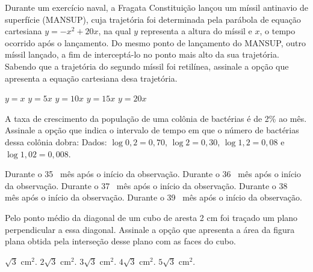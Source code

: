 \begin{question}%
Durante um exercício naval, a Fragata Constituição lançou um míssil antinavio de superfície (MANSUP), cuja trajetória foi determinada pela parábola de equação cartesiana \(y=-x^2 + 20x\), na qual \(y\) representa a altura do míssil e \(x\), o tempo ocorrido após o lançamento. Do mesmo ponto de lançamento do MANSUP, outro míssil lançado, a fim de interceptá-lo no ponto mais alto da sua trajetória. Sabendo que a trajetória do segundo míssil foi retilínea, assinale a opção que apresenta a equação cartesiana desa trajetória.
    \begin{tasks}
        \task \(y = x\)
        \task \(y = 5x\)
        \task \(y = 10x\)
        \task \(y = 15x\)
        \task \(y = 20x\)
    \end{tasks}
\end{question}

\begin{question}%
A taxa de crescimento da população de uma colônia de bactérias é de 2\% ao mês. Assinale a opção que indica o intervalo de tempo em que o número de bactérias dessa colônia dobra: Dados: \(\log 0,2 = 0,70\), \(\log 2 = 0,30\), \(\log 1,2 = 0,08\) e \(\log 1,02 = 0,008\).

    \begin{tasks}
        \task Durante o 35\textordmasculine~ mês após o início da observação.
        \task Durante o 36\textordmasculine~ mês após o início da observação.
        \task Durante o 37\textordmasculine~ mês após o início da observação.
        \task Durante o 38\textordmasculine~ mês após o início da observação.
        \task Durante o 39\textordmasculine~ mês após o início da observação.
    \end{tasks}
\end{question}

\begin{question}%
Pelo ponto médio da diagonal de um cubo de aresta 2 cm foi traçado um plano perpendicular a essa diagonal. Assinale a opção que apresenta a área da figura plana obtida pela interseção desse plano com as faces do cubo.
    \begin{tasks}
        \task \(\sqrt{3}\) cm\(^2\).
        \task \(2\sqrt{3}\) cm\(^2\).
        \task \(3\sqrt{3}\) cm\(^2\).
        \task \(4\sqrt{3}\) cm\(^2\).
        \task \(5\sqrt{3}\) cm\(^2\).
    \end{tasks}
\end{question}

